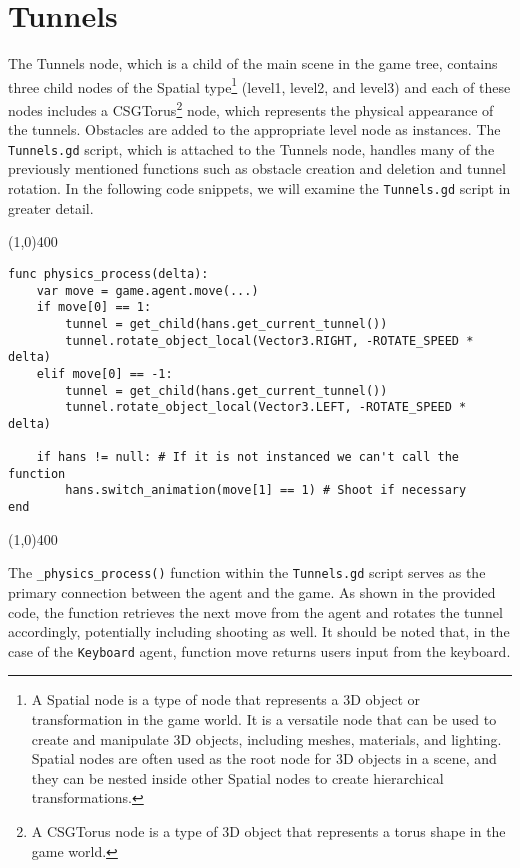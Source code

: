 \section{Tunnels}
\label{tunnel_script}
The Tunnels node, which is a child of the main scene in the game tree, contains three child nodes of the Spatial type\footnote{A Spatial node is a type of node that represents a 3D object or transformation in the game world. It is a versatile node that can be used to create and manipulate 3D objects, including meshes, materials, and lighting. Spatial nodes are often used as the root node for 3D objects in a scene, and they can be nested inside other Spatial nodes to create hierarchical transformations.} (level1, level2, and level3) and each of these nodes includes a CSGTorus\footnote{ A CSGTorus node is a type of 3D object that represents a torus shape in the game world.} node, which represents the physical appearance of the tunnels. Obstacles are added to the appropriate level node as instances. The \texttt{Tunnels.gd} script, which is attached to the Tunnels node, handles many of the previously mentioned functions such as obstacle creation and deletion and tunnel rotation. In the following code snippets, we will examine the \texttt{Tunnels.gd} script in greater detail.

\begin{center}
\line(1,0){400}
\begin{lstlisting}
func physics_process(delta):
    var move = game.agent.move(...)
    if move[0] == 1:
        tunnel = get_child(hans.get_current_tunnel())
        tunnel.rotate_object_local(Vector3.RIGHT, -ROTATE_SPEED * delta)
    elif move[0] == -1:
        tunnel = get_child(hans.get_current_tunnel())
        tunnel.rotate_object_local(Vector3.LEFT, -ROTATE_SPEED * delta)

    if hans != null: # If it is not instanced we can't call the function
        hans.switch_animation(move[1] == 1) # Shoot if necessary
end
\end{lstlisting}
\line(1,0){400}
\end{center}

The \texttt{\_physics\_process()} function within the \texttt{Tunnels.gd} script serves as the primary connection between the agent and the game. As shown in the provided code, the function retrieves the next move from the agent and rotates the tunnel accordingly, potentially including shooting as well. It should be noted that, in the case of the \texttt{Keyboard} agent, function move returns users input from the keyboard.

